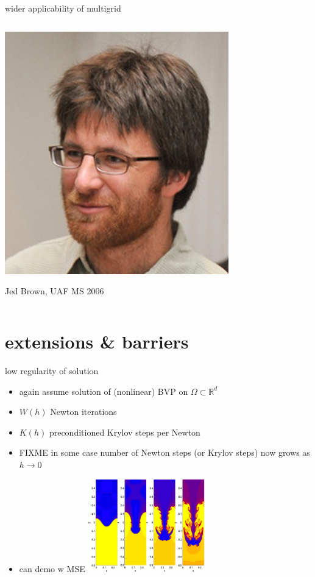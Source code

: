 \documentclass[hide notes,intlimits,usenames,dvipsnames]{beamer}
\newcommand{\RR}{\mathbb{R}}
\begin{document}
\begin{frame}{wider applicability of multigrid}
\begin{columns}
\begin{column}{0.2\textwidth}
\vspace{10mm}
\includegraphics[width=\textwidth]{figs/jed.jpg}

\tiny Jed Brown, UAF MS 2006
\end{column}
\end{columns}
\end{frame}


\section{extensions \& barriers}

\begin{frame}{low regularity of solution}
\begin{itemize}
\item again assume solution of (nonlinear) BVP on $\Omega \subset \RR^d$
\item $W(h)$ Newton iterations
\item $K(h)$ preconditioned Krylov steps per Newton
\item FIXME  in some case number of Newton steps (or Krylov steps) now grows as $h\to 0$
\item can demo w MSE  \includegraphics[width=0.4\textwidth]{figs/rayleigh-taylor-instability}
\end{itemize}
\end{frame}
\end{document}
